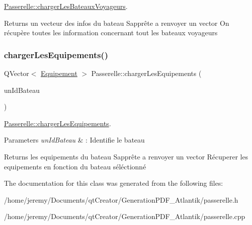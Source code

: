 \hyperlink{class_passerelle_a9f8cdd9d52d668bb33a5380324fb9c51}{Passerelle\+::charger\+Les\+Bateaux\+Voyageurs}. 

\begin{DoxyReturn}{Returns}
un vecteur des infos du bateau S\textquotesingle{}apprête a renvoyer un vector On récupère toutes les information concernant tout les bateaux voyageurs 
\end{DoxyReturn}
\mbox{\label{class_passerelle_a612df1d1532ab6a58efe8c0af66858a4}} 
\subsubsection{\texorpdfstring{charger\+Les\+Equipements()}{chargerLesEquipements()}}
{\footnotesize\ttfamily Q\+Vector$<$ \hyperlink{class_equipement}{Equipement} $>$ Passerelle\+::charger\+Les\+Equipements (\begin{DoxyParamCaption}\item[{Q\+String}]{un\+Id\+Bateau }\end{DoxyParamCaption})\hspace{0.3cm}{\ttfamily [static]}}



\hyperlink{class_passerelle_a612df1d1532ab6a58efe8c0af66858a4}{Passerelle\+::charger\+Les\+Equipements}. 


\begin{DoxyParams}{Parameters}
{\em un\+Id\+Bateau} & \+: Identifie le bateau \\
\hline
\end{DoxyParams}
\begin{DoxyReturn}{Returns}
les equipements du bateau S\textquotesingle{}apprête a renvoyer un vector Récuperer les equipements en fonction du bateau séléctionné 
\end{DoxyReturn}


The documentation for this class was generated from the following files\+:\begin{DoxyCompactItemize}
\item 
/home/jeremy/\+Documents/qt\+Creator/\+Generation\+P\+D\+F\+\_\+\+Atlantik/passerelle.\+h\item 
/home/jeremy/\+Documents/qt\+Creator/\+Generation\+P\+D\+F\+\_\+\+Atlantik/passerelle.\+cpp\end{DoxyCompactItemize}
